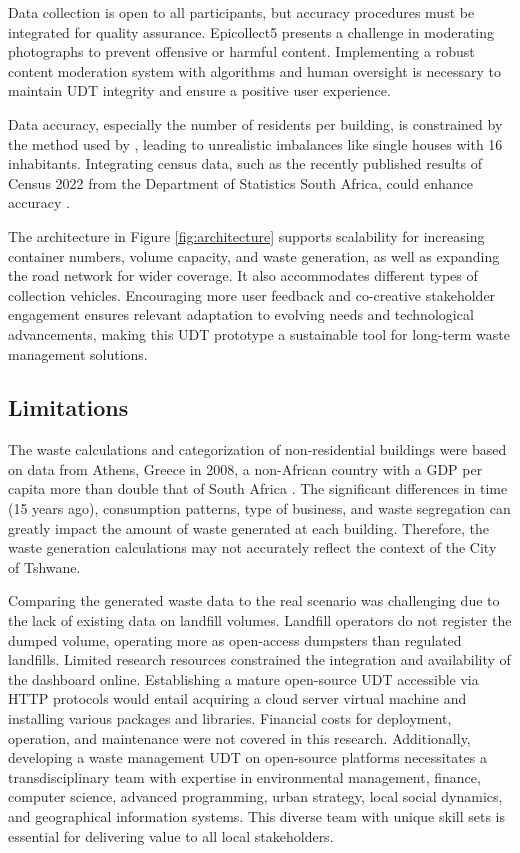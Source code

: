 \documentclass[authoryear,preprint,review,11pt,doubleblind]{elsarticle}
\begin{document}
    Data collection is open to all participants, but accuracy procedures must be integrated for quality assurance. Epicollect5 presents a challenge in moderating photographs to prevent offensive or harmful content. Implementing a robust content moderation system with algorithms and human oversight is necessary to maintain UDT integrity and ensure a positive user experience.
 
    Data accuracy, especially the number of residents per building, is constrained by the method used by \citet{Schiavina2022}, leading to unrealistic imbalances like single houses with 16 inhabitants. Integrating census data, such as the recently published results of Census 2022 from the Department of Statistics South Africa, could enhance accuracy \citep{statisticssouthafricaCensus202223}.

    The architecture in Figure \ref{fig:architecture} supports scalability for increasing container numbers, volume capacity, and waste generation, as well as expanding the road network for wider coverage. It also accommodates different types of collection vehicles.  Encouraging more user feedback and co-creative stakeholder engagement ensures relevant adaptation to evolving needs and technological advancements, making this UDT prototype a sustainable tool for long-term waste management solutions.

    \subsection{Limitations} \label{subsec:limitations}

    The waste calculations and categorization of non-residential buildings were based on data from Athens, Greece in 2008, a non-African country with a GDP per capita more than double that of South Africa  \citep{Bank2021}. The significant differences in time (15 years ago), consumption patterns, type of business, and waste segregation can greatly impact the amount of waste generated at each building. Therefore, the waste generation calculations may not accurately reflect the context of the City of Tshwane.

    Comparing the generated waste data to the real scenario was challenging due to the lack of existing data on landfill volumes. Landfill operators do not register the dumped volume, operating more as open-access dumpsters than regulated landfills. Limited research resources constrained the integration and availability of the dashboard online. Establishing a mature open-source UDT accessible via HTTP protocols would entail acquiring a cloud server virtual machine and installing various packages and libraries. Financial costs for deployment, operation, and maintenance were not covered in this research. Additionally, developing a waste management UDT on open-source platforms necessitates a transdisciplinary team with expertise in environmental management, finance, computer science, advanced programming, urban strategy, local social dynamics, and geographical information systems. This diverse team with unique skill sets is essential for delivering value to all local stakeholders.
\end{document}
